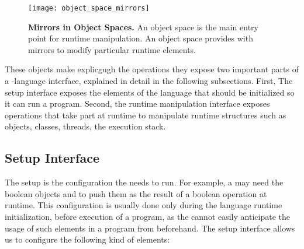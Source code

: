 \begin{figure}[htb]
\begin{center}
\texttt{[image: object\_space\_mirrors]}
\caption{\textbf{Mirrors in Object Spaces.} An object space is the main entry point for runtime manipulation. An object space provides with mirrors to modify particular runtime elements. \label{fig:objectSpaceMirrors}}
\end{center}
\end{figure}

These objects make explicgugh the operations they expose two important parts of a \VM-language interface, explained in detail in the following subsections. First, The \VM setup interface exposes the elements of the language that should be initialized so it can run a program. Second, the runtime manipulation interface exposes operations that take part at runtime to manipulate runtime structures such as objects, classes, threads, the execution stack.

\subsection{\VM Setup Interface}

The \VM setup is the configuration the \VM needs to run.
For example, a \VM may need the boolean objects  and  to push them as the result of a boolean operation at runtime.
This configuration is usually done only during the language runtime initialization, before execution of a program, as the \VM cannot easily anticipate the usage of such elements in a program from beforehand.
The \VM setup interface allows us to configure the following kind of elements:

